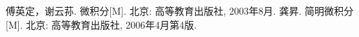\cleardoublepage
{}
{}
\begin{thebibliography}{99}
     傅英定，谢云荪. 微积分[M]. 北京: 高等教育出版社, 2003年8月.
     龚昇. 简明微积分[M]. 北京: 高等教育出版社, 2006年4月第4版.
\end{thebibliography}





